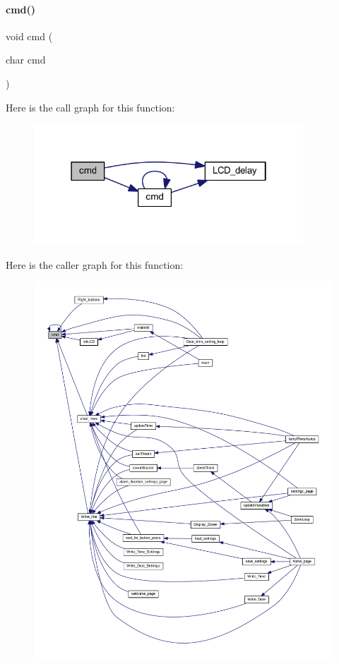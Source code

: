 \paragraph{cmd()}
{\footnotesize\ttfamily void cmd (\begin{DoxyParamCaption}\item[{char}]{cmd }\end{DoxyParamCaption})}

Here is the call graph for this function\+:
\nopagebreak
\begin{figure}[H]
\begin{center}
\leavevmode
\includegraphics[width=286pt]{a00035_ac1f52f9c871ece7cb377c4fea1c6c79d_cgraph}
\end{center}
\end{figure}
Here is the caller graph for this function\+:
\nopagebreak
\begin{figure}[H]
\begin{center}
\leavevmode
\includegraphics[width=350pt]{a00035_ac1f52f9c871ece7cb377c4fea1c6c79d_icgraph}
\end{center}
\end{figure}
\mbox{\label{a00035_a54955197a7b52d9a202b75527f68cc08}} 

